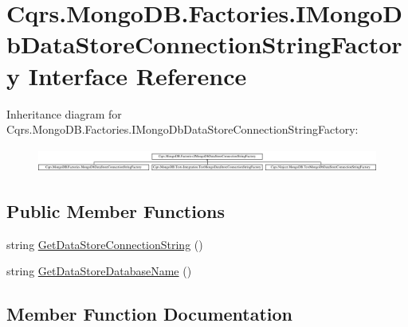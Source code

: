 \hypertarget{interfaceCqrs_1_1MongoDB_1_1Factories_1_1IMongoDbDataStoreConnectionStringFactory}{}\section{Cqrs.\+Mongo\+D\+B.\+Factories.\+I\+Mongo\+Db\+Data\+Store\+Connection\+String\+Factory Interface Reference}
\label{interfaceCqrs_1_1MongoDB_1_1Factories_1_1IMongoDbDataStoreConnectionStringFactory}
Inheritance diagram for Cqrs.\+Mongo\+D\+B.\+Factories.\+I\+Mongo\+Db\+Data\+Store\+Connection\+String\+Factory\+:\begin{figure}[H]
\begin{center}
\leavevmode
\includegraphics[height=0.802867cm]{interfaceCqrs_1_1MongoDB_1_1Factories_1_1IMongoDbDataStoreConnectionStringFactory}
\end{center}
\end{figure}
\subsection*{Public Member Functions}
\begin{DoxyCompactItemize}
\item 
string \hyperlink{interfaceCqrs_1_1MongoDB_1_1Factories_1_1IMongoDbDataStoreConnectionStringFactory_a31cb87fb2cf1435912f635394494ed91}{Get\+Data\+Store\+Connection\+String} ()
\item 
string \hyperlink{interfaceCqrs_1_1MongoDB_1_1Factories_1_1IMongoDbDataStoreConnectionStringFactory_aca9921fae4214a9eb22a221825c57363}{Get\+Data\+Store\+Database\+Name} ()
\end{DoxyCompactItemize}


\subsection{Member Function Documentation}
\mbox{\label{interfaceCqrs_1_1MongoDB_1_1Factories_1_1IMongoDbDataStoreConnectionStringFactory_a31cb87fb2cf1435912f635394494ed91}} 
